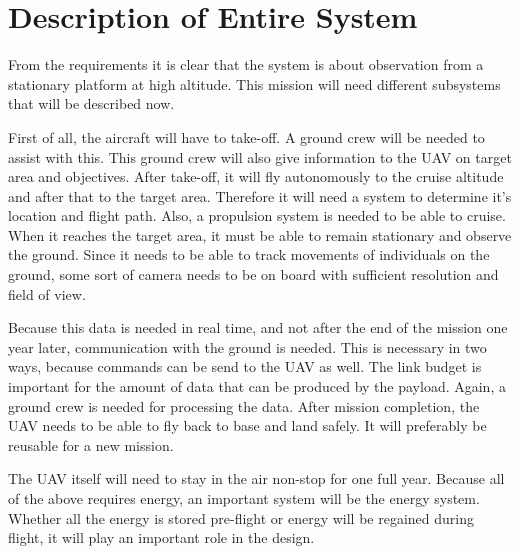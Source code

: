 \documentclass[a4paper]{report}
\begin{document}
\section{Description of Entire System}
\label{sec:SystemDescription}
From the requirements it is clear that the system is about observation from a stationary platform at high altitude. This mission will need different subsystems that will be described now.

First of all, the aircraft will have to take-off. A ground crew will be needed to assist with this. This ground crew will also give information to the UAV on target area and objectives. After take-off, it will fly autonomously to the cruise altitude and after that to the target area. Therefore it will need a system to determine it's location and flight path. Also, a propulsion system is needed to be able to cruise. When it reaches the target area, it must be able to remain stationary and observe the ground. Since it needs to be able to track movements of individuals on the ground, some sort of camera needs to be on board with sufficient resolution and field of view. 

Because this data is needed in real time, and not after the end of the mission one year later, communication with the ground is needed. This is necessary in two ways, because commands can be send to the UAV as well. The link budget is important for the amount of data that can be produced by the payload. Again, a ground crew is needed for processing the data. After mission completion, the UAV needs to be able to fly back to base and land safely. It will preferably be reusable for a new mission.

The UAV itself will need to stay in the air non-stop for one full year. Because all of the above requires energy, an important system will be the energy system. Whether all the energy is stored pre-flight or energy will be regained during flight, it will play an important role in the design.
\end{document}

